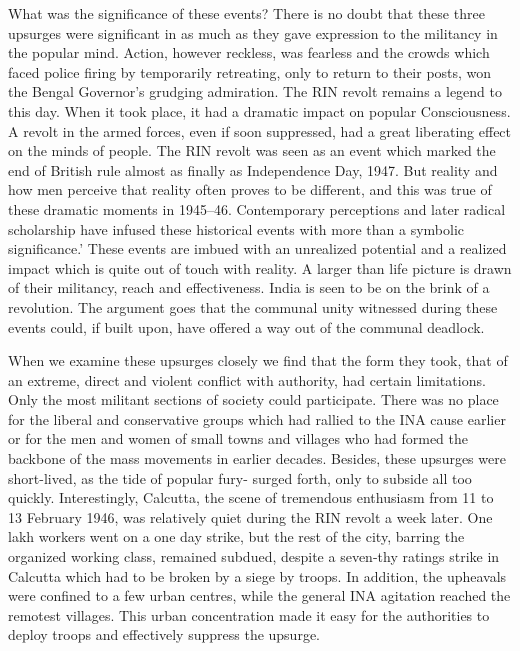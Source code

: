 What was the significance of these events? There is no doubt that these three upsurges were significant in as much as they gave expression to the militancy in the popular mind. Action, however reckless, was fearless and the crowds which faced police firing by temporarily retreating, only to return to their posts, won the Bengal Governor's grudging admiration. The RIN revolt remains a legend to this day. When it took place, it had a dramatic impact on popular Consciousness. A revolt in the armed forces, even if soon suppressed, had a great liberating effect on the minds of people. The RIN revolt was seen as an event which marked the end of British rule almost as finally as Independence Day, 1947. But reality and how men perceive that reality often proves to be different, and this was true of these dramatic moments in 1945--46. Contemporary perceptions and later radical scholarship have infused these historical events with more than a symbolic significance.' These events are imbued with an unrealized potential and a realized impact which is quite out of touch with reality. A larger than life picture is drawn of their militancy, reach and effectiveness. India is seen to be on the brink of a revolution. The argument goes that the communal unity witnessed during these events could, if built upon, have offered a way out of the communal deadlock. 

When we examine these upsurges closely we find that the form they took, that of an extreme, direct and violent conflict with authority, had certain limitations. Only the most militant sections of society could participate. There was no place for the liberal and conservative groups which had rallied to the INA cause earlier or for the men and women of small towns and villages who had formed the backbone of the mass movements in earlier decades. Besides, these upsurges were short-lived, as the tide of popular fury- surged forth, only to subside all too quickly. Interestingly, Calcutta, the scene of tremendous enthusiasm from 11 to 13 February 1946, was relatively quiet during the RIN revolt a week later. One lakh workers went on a one day strike, but the rest of the city, barring the organized working class, remained subdued, despite a seven-thy ratings strike in Calcutta which had to be broken by a siege by troops. In addition, the upheavals were confined to a few urban centres, while the general INA agitation reached the remotest villages. This urban concentration made it easy for the authorities to deploy troops and effectively suppress the upsurge. 


